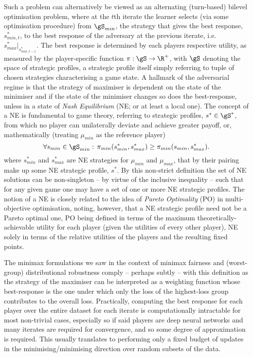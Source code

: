 Such a problem can alternatively be viewed as an alternating (turn-based) bilevel optimisation
problem, where at the \(t\)th iterate the learner selects (via some optimisation procedure) from \(
\gS_{min} \), the strategy that gives the best response, \(s_{min, t}^{\ast}\), to the best
response of the adversary at the previous iterate, i.e. \( s_{max}^\ast|_{s_{min,t-1}^\ast} \).
%
The best response is determined by each players respective utility, as measured by the
player-specific function \(\pi: \gS \to \R^+\), with \(\gS\) denoting the space of strategic
profiles,  a strategic profile itself simply referring to tuple of chosen strategies characterising
a game state.
%
A hallmark of the adversarial regime is that the strategy of maximiser is dependent on the
state of the minimiser and if the state of the minimiser changes so does the best-response, unless 
in a state of \emph{Nash Equilibrium} (NE; or at least a local one).  
%
The concept of a NE is fundamental to game theory, referring to strategic profiles, \(s^\ast \in
\gS^\ast\), from which no player can unilaterally deviate and achieve greater payoff, or,
mathematically (treating \(\mu_{min}\) as the reference player)
%
\begin{equation}
  \forall s_{min} \in \gS_{min}:\, \pi_{min} ( s^\ast_{min}, s^\ast_{max} ) \ge \pi_{min}(
  s_{min}, s^\ast_{max} ).
\end{equation}
%
where \(s^\ast_{min}\) and \(s^\ast_{max} \) are NE strategies for \(\mu_{min}\) and \( \mu_{max}
\), that by their pairing make up some NE strategic profile, \(s^\ast\).
%
%
By this non-strict definition the set of NE solutions can be non-singleton -- by virtue of the
inclusive inequality -- such that for any given game one may have a set of one or more NE strategic
profiles.
%
The notion of a NE is closely related to the idea of \emph{Pareto Optimality} (PO) in
multi-objective optimisation, noting, however, that a NE strategic profile need not be a Pareto
optimal one, PO being defined in terms of the maximum theoretically-achievable utility for each
player (given the utilities of every other player), NE solely in terms of the relative utilities of
the players and the resulting fixed points.

%
The minimax formulations we saw in the context of minimax fairness and (worst-group) distributional
robustness comply -- perhaps subtly -- with this definition as the strategy of the maximiser can be
interpreted as a weighting function whose best-response is the one under which only the loss of the
highest-loss group contributes to the overall loss. 
%
Practically, computing the best response for each player over the entire dataset for each iterate is
computationally intractable for most non-trivial cases, especially so if said players are deep
neural networks and many iterates are required for convergence, and so some degree of approximation
is required.
%
This usually translates to performing only a fixed budget of updates in the minimising/minimising
direction over random subsets of the data.

